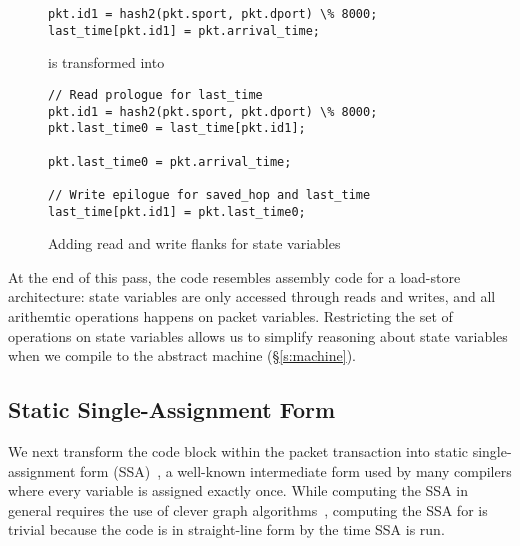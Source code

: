 \begin{figure}
\begin{tiny}
\begin{lstlisting}
pkt.id1 = hash2(pkt.sport, pkt.dport) \% 8000;
last_time[pkt.id1] = pkt.arrival_time;
\end{lstlisting}
\end{tiny}
\begin{center}
is transformed into
\end{center}
\begin{tiny}
\begin{lstlisting}
// Read prologue for last_time
pkt.id1 = hash2(pkt.sport, pkt.dport) \% 8000;
pkt.last_time0 = last_time[pkt.id1];

pkt.last_time0 = pkt.arrival_time;

// Write epilogue for saved_hop and last_time
last_time[pkt.id1] = pkt.last_time0;
\end{lstlisting}
\end{tiny}
\caption{Adding read and write flanks for state variables}
\label{fig:stateful_flanks}
\end{figure}

At the end of this pass, the code resembles assembly code for a load-store
architecture: state variables are only accessed through reads and writes, and
all arithemtic operations happens on packet variables. Restricting the set of
operations on state variables allows us to simplify reasoning about state
variables when we compile \pktlanguage to the abstract machine
(\S\ref{s:machine}).



\subsection{Static Single-Assignment Form}
We next transform the code block within the packet transaction into static
single-assignment form (SSA)~\cite{ferrante_ssa}, a well-known intermediate
form used by many compilers where every variable is assigned exactly once.
While computing the SSA in general requires the use of clever graph
algorithms~\cite{post_dominators}, computing the SSA for \pktlanguage is
trivial because the code is in straight-line form by the time SSA is run.

